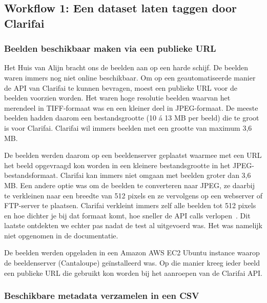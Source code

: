 \subsection{Workflow 1: Een dataset laten taggen door Clarifai}
\label{subsec:workflow1}


\subsubsection{Beelden beschikbaar maken via een publieke URL}

Het Huis van Alijn bracht ons de beelden aan op een harde schijf. De beelden waren immers nog niet online beschikbaar. Om op een geautomatiseerde manier de API van Clarifai te kunnen bevragen, moest een publieke URL voor de beelden voorzien worden. Het waren hoge resolutie beelden waarvan het merendeel in TIFF-formaat was en een kleiner deel in JPEG-formaat. De meeste beelden hadden daarom een bestandsgrootte (10 \'{a} 13 MB per beeld) die te groot is voor Clarifai. Clarifai wil immers beelden met een grootte van maximum 3,6 MB. 

De beelden werden daarom op een beeldenserver geplaatst waarmee met een URL het beeld opgevraagd kon worden in een kleinere bestandsgrootte in het JPEG-bestandsformaat. Clarifai kan immers niet omgaan met beelden groter dan 3,6 MB. Een andere optie was om de beelden te converteren naar JPEG, ze daarbij te verkleinen naar een breedte van 512 pixels en ze vervolgens op een webserver of FTP-server te plaatsen. Clarifai verkleint immers zelf alle beelden tot 512 pixels en hoe dichter je bij dat formaat komt, hoe sneller de API calls verlopen~\autocite{Clairbot2019}. Dit laatste ontdekten we echter pas nadat de test al uitgevoerd was. Het was namelijk niet opgenomen in de documentatie.

De beelden werden opgeladen in een Amazon AWS EC2 Ubuntu instance waarop de beeldenserver (Cantaloupe) ge\"{i}nstalleerd was. Op die manier kreeg ieder beeld een publieke URL die gebruikt kon worden bij het aanroepen van de Clarifai API.

\subsubsection{Beschikbare metadata verzamelen in een CSV}
\label{subsubsec:metadata-verzamelen-csv}

